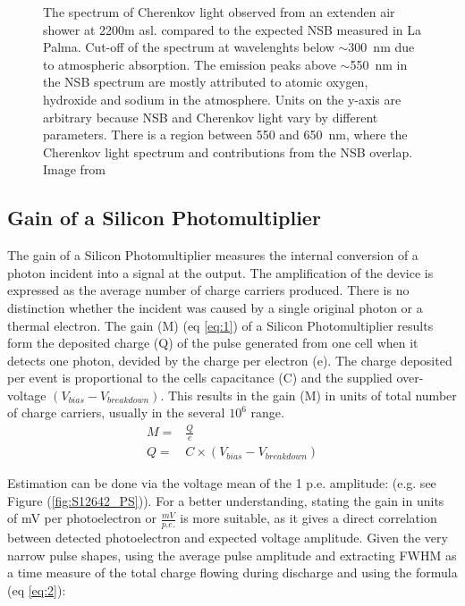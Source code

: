 \documentclass[12pt,article,type=msc,colorback,accentcolor=tud9c]{tudthesis}
\begin{document}
\begin{figure}[t]
\begin{centering}
\caption[Cherenkov light spectrum]{The spectrum of Cherenkov light observed from an extenden air shower at 2200m asl. compared to the expected NSB measured in La Palma. Cut-off of the spectrum at wavelenghts below $\sim$300~nm due to atmospheric absorption. The emission peaks above $\sim$550~nm in the NSB spectrum are mostly attributed to atomic oxygen, hydroxide and sodium in the atmosphere. Units on the y-axis are arbitrary because NSB and Cherenkov light vary by different parameters. There is a region between 550 and 650~nm, where the Cherenkov light spectrum and contributions from the NSB overlap. Image from \cite{SiPMvsMAPMT}}
\label{fig:Cherenkov_NSB}
\end{centering}
\end{figure}


\subsection{Gain of a Silicon Photomultiplier}
\label{subsec:SiPMGain}
The gain of a Silicon Photomultiplier measures the internal conversion of a photon incident into a signal at the output. The amplification of the device is expressed as the average number of charge carriers produced. There is no distinction whether the incident was caused by a single original photon or a thermal electron. The gain (M) (eq \ref{eq:1}) of a Silicon Photomultiplier results form the deposited charge (Q) of the pulse generated from one cell when it detects one photon, devided by the charge per electron (e). The charge deposited per event is proportional to the cells capacitance (C) and the supplied over-voltage $(V_{bias}-V_{breakdown})$.\cite{SiPMvsMAPMT} This results in the gain (M) in units of total number of charge carriers, usually in the several $10^6$ range.
\begin{equation}\label{eq:1}
\begin{split}
M = & \frac{Q}{e} \\
Q = &  C \times (V_{bias}-V_{breakdown})
\end{split}
\end{equation}

Estimation can be done via the voltage mean of the 1 p.e. amplitude: (e.g. see Figure (\ref{fig:S12642_PS})). For a better understanding, stating the gain in units of mV per photoelectron or $\frac{mV}{p.e.}$ is more suitable, as it gives a direct correlation between detected photoelectron and expected voltage amplitude. Given the very narrow pulse shapes, using the average pulse amplitude and extracting FWHM as a time measure of the total charge flowing during discharge and using the formula (eq \ref{eq:2}):
\end{document}
